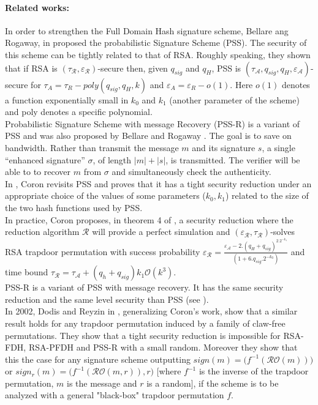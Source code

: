 \documentclass[a4paper,11pt]{article}
\begin{document}
\paragraph{Related works:}
In order to strengthen the Full Domain Hash signature scheme, Bellare ang Rogaway, in \cite{Bellare2} proposed the probabilistic Signature Scheme (PSS). The security of this scheme can be tightly related to that of RSA. Roughly speaking, they shown that if RSA is $(\tau_\mathcal{R},\varepsilon_\mathcal{R})$-secure then, given $q_{sig}$ and $q_H$, PSS is $(\tau_\mathcal{A},q_{sig},q_{H},\varepsilon_\mathcal{A})$-secure for $\tau_{A}=\tau_{R}-poly(q_{sig},q_{H},k)$ and $\varepsilon_{A}=\varepsilon_{R}-o(1)$. Here $o(1)$ denotes a function exponentially small in $k_0$ and $k_1$ (another parameter of the scheme) and poly denotes a specific polynomial.\\
Probabilistic Signature Scheme with message Recovery (PSS-R) is a variant of PSS and was also proposed by Bellare and Rogaway \cite{Bellare2}.  The goal is to save on bandwidth. Rather than transmit the message $m$ and its signature $s$, a single ``enhanced signature'' $\sigma$, of length $|m|+|s|$, is transmitted. The verifier will be able to to recover $m$ from $\sigma$ and simultaneously check the authenticity.\\
In \cite{Coron-GHR-PSS}, Coron revisits PSS and proves that it has a  tight security reduction under an appropriate choice of the values of some parameters ($k_{0}, k_{1}$) related to the size of the two hash functions used by PSS.\\
In practice, Coron proposes, in theorem 4 of \cite{Coron-GHR-PSS}, a security reduction where the reduction algorithm  $\mathcal{R}$ will provide a perfect simulation and $(\varepsilon_{\mathcal{R}}, \tau_{\mathcal{R}})$-solves RSA trapdoor permutation with success probability $\varepsilon_\mathcal{R}=\frac{\varepsilon_\mathcal{A}-2.(q_H+q_{sig})^2.2^{-k_1}}{(1+6.q_{sig}.2^{-k_0})}$ and time bound $\tau_{\mathcal{R}}= \tau_{\mathcal{A}} + (q_{h}+q_{sig})k_{1}\mathcal{O}(k^{3})$. \\
PSS-R is a variant of PSS with message recovery. It has the same security reduction and the same level security than PSS (see \cite{Coron-GHR-PSS}).\\
In 2002, Dodis and Reyzin in \cite{Dodis}, generalizing Coron's work, show that a similar result holds for any trapdoor
 permutation induced by a family of claw-free permutations. They show that a tight security reduction is impossible for RSA-FDH, RSA-PFDH and PSS-R with a small random. Moreover they show that this the case for any signature scheme outputting $sign(m)=\big(f^{-1}(\mathcal{RO}(m))\big)$ or $sign_{r}(m)=\big(f^{-1}(\mathcal{RO}(m, r)), r\big)$ [where $f^{-1}$ is the inverse of the trapdoor permutation, $m$ is the message and $r$ is a random], if the scheme is to be analyzed with a general "black-box" trapdoor permutation $f$.\\
\end{document}
